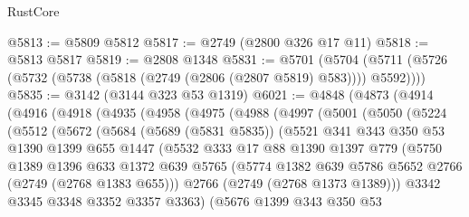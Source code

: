 \begin{lexlean}{RustCore}
\begin{coremodule}
@5813 := @5809 @5812
@5817 := @2749 (@2800 @326 @17 @11)
@5818 := @5813 @5817
@5819 := @2808 @1348
@5831 := @5701
    (@5704 (@5711 (@5726 (@5732 (@5738 (@5818 (@2749 (@2806 (@2807 @5819) @583)))) @5592))))
@5835 := @3142 (@3144 @323 @53 @1319)
@6021 := @4848
    (@4873
      (@4914
        (@4916
          (@4918
            (@4935
              (@4958
                (@4975
                  (@4988
                    (@4997
                      (@5001
                        (@5050
                          (@5224
                            (@5512
                              (@5672
                                (@5684
                                  (@5689 (@5831 @5835))
                                  (@5521
                                    @341
                                    @343
                                    @350
                                    @53
                                    @1390
                                    @1399
                                    @655
                                    @1447
                                    (@5532
                                      @333
                                      @17
                                      @88
                                      @1390
                                      @1397
                                      @779
                                      (@5750
                                        @1389
                                        @1396
                                        @633
                                        @1372
                                        @639
                                        @5765
                                        (@5774
                                          @1382
                                          @639
                                          @5786
                                          @5652
                                          @2766
                                          (@2749 (@2768 @1383 @655)))
                                        @2766
                                        (@2749 (@2768 @1373 @1389)))
                                      @3342
                                      @3345
                                      @3348
                                      @3352
                                      @3357
                                      @3363)
                                    (@5676
                                      @1399
                                      @343
                                      @350
                                      @53

\end{coremodule}
\end{lexlean}

